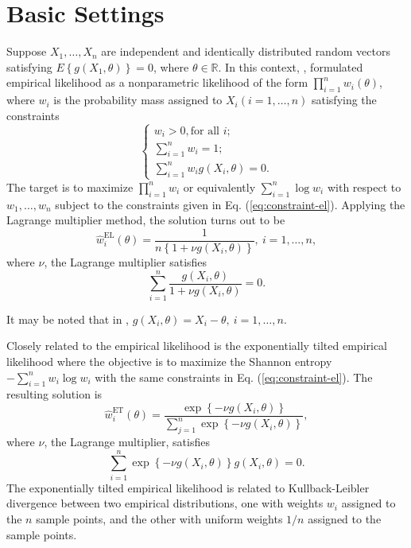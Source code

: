 \section{Basic Settings }

Suppose $X_{1},\ldots,X_{n}$ are independent and identically distributed
random  vectors satisfying $E\left\{ g\left(X_{1},\theta\right)\right\} =0$,
where $\theta\in\mathbb{R}$. In this context, \cite{owen1988empirical},
formulated empirical likelihood as a nonparametric likelihood of the
form $\prod_{i=1}^{n}w_{i}\left(\theta\right)$, where $w_{i}$ is
the probability mass assigned to $X_{i}\left(i=1,\ldots,n\right)$
satisfying the constraints 
\begin{equation}
\begin{cases}
w_{i}>0,\text{for all } i;\\
\sum_{i=1}^{n}w_{i}=1;\\
\sum_{i=1}^{n}w_{i}g\left(X_{i},\theta\right)=0.
\end{cases}\label{eq:constraint-el}
\end{equation}
The target is to maximize $\prod_{i=1}^{n}w_{i}$ or equivalently
$\sum_{i=1}^{n}\log w_{i}$ with respect to $w_{1},\ldots,w_{n}$
subject to the constraints given in Eq. (\ref{eq:constraint-el}). Applying
the Lagrange multiplier method, the solution turns out to be 
\begin{equation}
\hat{w}_{i}^{\mathrm{EL}}\left(\theta\right)=\frac{1}{n\left\{ 1+\nu g\left(X_{i},\theta\right)\right\} },\: i=1,\ldots,n,\label{eq:sol-emp-lik}
\end{equation}
where $\nu$, the Lagrange multiplier satisfies 
\begin{equation}
\sum_{i=1}^{n}\frac{g\left(X_{i},\theta\right)}{1+\nu g\left(X_{i},\theta\right)}=0.\label{eq:lambda-eq}
\end{equation}


It may be noted that in  \cite{fang2005expected,fang2006empirical}%
{}, $g\left(X_{i},\theta\right)=X_{i}-\theta,\:i=1,\ldots,n$. 

Closely related to the empirical likelihood is the exponentially tilted
empirical likelihood where the objective is to maximize the Shannon
entropy $-\sum_{i=1}^{n}w_{i}\log w_{i}$ with the same constraints
in Eq. (\ref{eq:constraint-el}). The resulting solution is 
\[
\hat{w}_{i}^{\mathrm{ET}}\left(\theta\right)=\frac{\exp\left\{ -\nu g\left(X_{i},\theta\right)\right\} }{\sum_{j=1}^{n}\exp\left\{ -\nu g\left(X_{i},\theta\right)\right\} },
\]
where $\nu$, the Lagrange multiplier, satisfies 
\begin{equation}
\sum_{i=1}^{n}\exp\left\{ -\nu g\left(X_{i},\theta\right)\right\} g\left(X_{i},\theta\right)=0.\label{eq:lag-mul-exp-tilt-el}
\end{equation}
The exponentially tilted empirical likelihood is related to Kullback-Leibler
divergence between two empirical distributions, one with weights $w_{i}$
assigned to the $n$ sample points, and the other with uniform weights
$1/n$ assigned to the sample points. 

